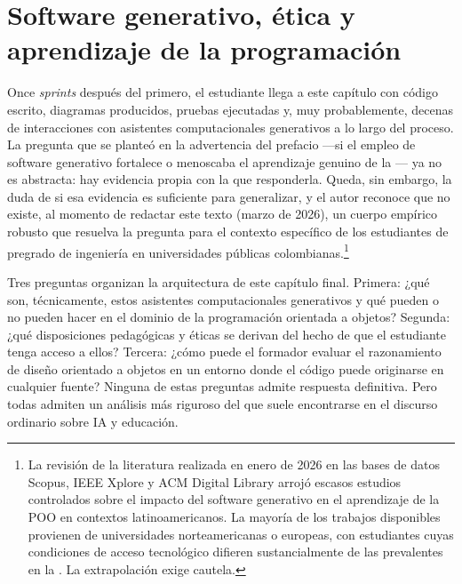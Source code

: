 
\chapter{Software generativo, ética y aprendizaje de la programación}
\label{cap:ia-etica}


\noindent
Once \textit{sprints} después del primero, el estudiante llega a este
capítulo con código escrito, diagramas producidos, pruebas ejecutadas
y, muy probablemente, decenas de interacciones con asistentes
computacionales generativos a lo largo del proceso. La pregunta que
se planteó en la advertencia del prefacio ---si el empleo de software
generativo fortalece o menoscaba el aprendizaje genuino de la
\poo--- ya no es abstracta: hay evidencia propia con la que responderla.
Queda, sin embargo, la duda de si esa evidencia es suficiente para
generalizar, y el autor reconoce que no existe, al momento de redactar
este texto (marzo de 2026), un cuerpo empírico robusto que resuelva
la pregunta para el contexto específico de los estudiantes de pregrado
de ingeniería en universidades públicas colombianas.\footnote{%
  La revisión de la literatura realizada en enero de 2026 en las bases
  de datos Scopus, IEEE Xplore y ACM Digital Library arrojó escasos
  estudios controlados sobre el impacto del software generativo en el
  aprendizaje de la POO en contextos latinoamericanos. La mayoría de los
  trabajos disponibles provienen de universidades norteamericanas o europeas,
  con estudiantes cuyas condiciones de acceso tecnológico difieren
  sustancialmente de las prevalentes en la \ud. La extrapolación exige cautela.}

Tres preguntas organizan la arquitectura de este capítulo final.
Primera: ¿qué son, técnicamente, estos asistentes computacionales
generativos y qué pueden o no pueden hacer en el dominio de la
programación orientada a objetos? Segunda: ¿qué disposiciones pedagógicas
y éticas se derivan del hecho de que el estudiante tenga acceso a ellos?
Tercera: ¿cómo puede el formador evaluar el razonamiento de diseño
orientado a objetos en un entorno donde el código puede originarse en
cualquier fuente? Ninguna de estas preguntas admite respuesta definitiva.
Pero todas admiten un análisis más riguroso del que suele encontrarse en
el discurso ordinario sobre IA y educación.

